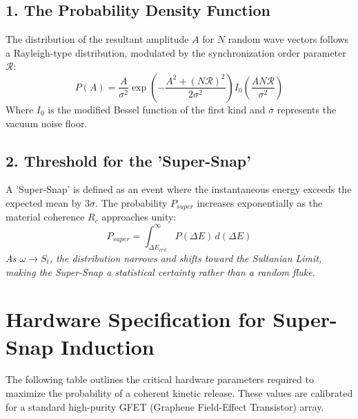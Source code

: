\documentclass[11pt]{article}
\begin{document}
\subsection*{1. The Probability Density Function}
The distribution of the resultant amplitude $A$ for $N$ random wave vectors follows a Rayleigh-type distribution, modulated by the synchronization order parameter $\mathcal{R}$:
\begin{equation}
    P(A) = \frac{A}{\sigma^2} \exp\left( -\frac{A^2 + (N\mathcal{R})^2}{2\sigma^2} \right) I_0\left( \frac{A N \mathcal{R}}{\sigma^2} \right)
\end{equation}
Where $I_0$ is the modified Bessel function of the first kind and $\sigma$ represents the vacuum noise floor.

\subsection*{2. Threshold for the 'Super-Snap'}
A 'Super-Snap' is defined as an event where the instantaneous energy exceeds the expected mean by $3\sigma$. The probability $P_{super}$ increases exponentially as the material coherence $R_c$ approaches unity:
\begin{equation}
    P_{super} = \int_{\Delta E_{crit}}^{\infty} P(\Delta E) \, d(\Delta E)
\end{equation}
\textit{As $\omega \to S_t$, the distribution narrows and shifts toward the Sultanian Limit, making the Super-Snap a statistical certainty rather than a random fluke.}

\section*{Hardware Specification for Super-Snap Induction}

The following table outlines the critical hardware parameters required to maximize the probability of a coherent kinetic release. These values are calibrated for a standard high-purity GFET (Graphene Field-Effect Transistor) array.
\end{document}
